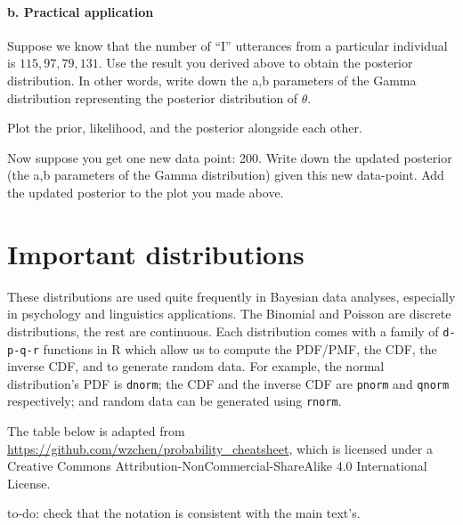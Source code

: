 \documentclass[12pt,]{krantz}
\begin{document}
\hypertarget{b.-practical-application}{%
\subsubsection{b. Practical application}\label{b.-practical-application}}

Suppose we know that the number of ``I'' utterances from a particular individual is \(115, 97, 79, 131\). Use the result you derived above to obtain the posterior distribution. In other words, write down the a,b parameters of the Gamma distribution representing the posterior distribution of \(\theta\).

Plot the prior, likelihood, and the posterior alongside each other.

Now suppose you get one new data point: 200. Write down the updated posterior (the a,b parameters of the Gamma distribution) given this new data-point. Add the updated posterior to the plot you made above.

\hypertarget{important-distributions}{%
\chapter{Important distributions}\label{important-distributions}}

These distributions are used quite frequently in Bayesian data analyses, especially in psychology and linguistics applications. The Binomial and Poisson are discrete distributions, the rest are continuous. Each distribution comes with a family of \texttt{d-p-q-r} functions in R which allow us to compute the PDF/PMF, the CDF, the inverse CDF, and to generate random data. For example, the normal distribution's PDF is \texttt{dnorm}; the CDF and the inverse CDF are \texttt{pnorm} and \texttt{qnorm} respectively; and random data can be generated using \texttt{rnorm}.

The table below is adapted from \url{https://github.com/wzchen/probability_cheatsheet}, which is licensed under a Creative Commons Attribution-NonCommercial-ShareAlike 4.0 International License.

to-do: check that the notation is consistent with the main text's.
\end{document}
